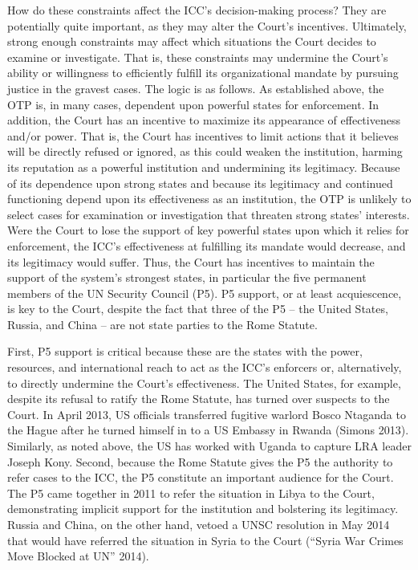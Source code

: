 How do these constraints affect the ICC's decision-making process? They are potentially quite important, as they may alter the Court's incentives. Ultimately, strong enough constraints may affect which situations the Court decides to examine or investigate.  That is, these constraints may undermine the Court's ability or willingness to efficiently fulfill its organizational mandate by pursuing justice in the gravest cases. The logic is as follows. As established above, the OTP is, in many cases, dependent upon powerful states for enforcement. In addition, the Court has an incentive to maximize its appearance of effectiveness and/or power. That is, the Court has incentives to limit actions that it believes will be directly refused or ignored, as this could weaken the institution, harming its reputation as a powerful institution and undermining its legitimacy.  Because of its dependence upon strong states and because its legitimacy and continued functioning depend upon its effectiveness as an institution, the OTP is unlikely to select cases for examination or investigation that threaten strong states' interests. Were the Court to lose the support of key powerful states upon which it relies for enforcement, the ICC's effectiveness at fulfilling its mandate would decrease, and its legitimacy would suffer.  Thus, the Court has incentives to maintain the support of the system's strongest states, in particular the five permanent members of the UN Security Council (P5). P5 support, or at least acquiescence, is key to the Court, despite the fact that three of the P5 – the United States, Russia, and China – are not state parties to the Rome Statute.  

First, P5 support is critical because these are the states with the power, resources, and international reach to act as the ICC's enforcers or, alternatively, to directly undermine the Court's effectiveness.  The United States, for example, despite its refusal to ratify the Rome Statute, has turned over suspects to the Court. In April 2013, US officials transferred fugitive warlord Bosco Ntaganda to the Hague after he turned himself in to a US Embassy in Rwanda (Simons 2013).  Similarly, as noted above, the US has worked with Uganda to capture LRA leader Joseph Kony. Second, because the Rome Statute gives the P5 the authority to refer cases to the ICC, the P5 constitute an important audience for the Court. The P5 came together in 2011 to refer the situation in Libya to the Court, demonstrating implicit support for the institution and bolstering its legitimacy. Russia and China, on the other hand, vetoed a UNSC resolution in May 2014 that would have referred the situation in Syria to the Court (``Syria War Crimes Move Blocked at UN'' 2014). 


